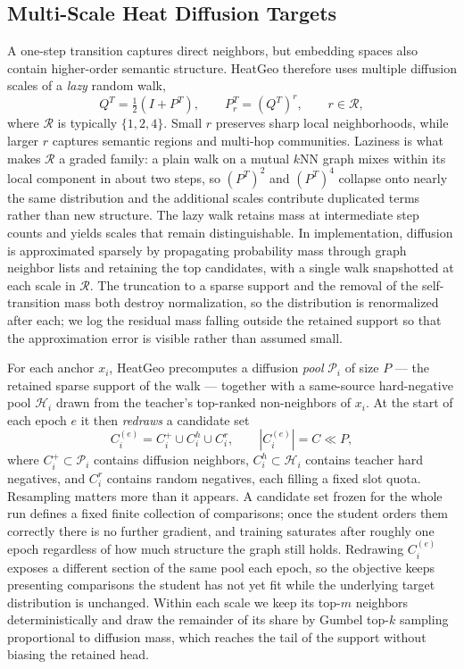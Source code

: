 \subsection{Multi-Scale Heat Diffusion Targets}

A one-step transition captures direct neighbors, but embedding spaces also contain higher-order semantic structure. HeatGeo therefore uses multiple diffusion scales of a \emph{lazy} random walk,
\begin{equation}
    Q^T = \tfrac{1}{2}\left(I + P^T\right),
    \qquad
    P_r^T = (Q^T)^r,
    \qquad r \in \mathcal{R},
\end{equation}
where $\mathcal{R}$ is typically $\{1,2,4\}$. Small $r$ preserves sharp local neighborhoods, while larger $r$ captures semantic regions and multi-hop communities. Laziness is what makes $\mathcal{R}$ a graded family: a plain walk on a mutual $k$NN graph mixes within its local component in about two steps, so $(P^T)^2$ and $(P^T)^4$ collapse onto nearly the same distribution and the additional scales contribute duplicated terms rather than new structure. The lazy walk retains mass at intermediate step counts and yields scales that remain distinguishable. In implementation, diffusion is approximated sparsely by propagating probability mass through graph neighbor lists and retaining the top candidates, with a single walk snapshotted at each scale in $\mathcal{R}$. The truncation to a sparse support and the removal of the self-transition mass both destroy normalization, so the distribution is renormalized after each; we log the residual mass falling outside the retained support so that the approximation error is visible rather than assumed small.

For each anchor $x_i$, HeatGeo precomputes a diffusion \emph{pool} $\mathcal{P}_i$ of size $P$ --- the retained sparse support of the walk --- together with a same-source hard-negative pool $\mathcal{H}_i$ drawn from the teacher's top-ranked non-neighbors of $x_i$. At the start of each epoch $e$ it then \emph{redraws} a candidate set
\begin{equation}
    C_i^{(e)} = C_i^{+} \cup C_i^{h} \cup C_i^{r},
    \qquad |C_i^{(e)}| = C \ll P,
\end{equation}
where $C_i^{+}\subset\mathcal{P}_i$ contains diffusion neighbors, $C_i^{h}\subset\mathcal{H}_i$ contains teacher hard negatives, and $C_i^{r}$ contains random negatives, each filling a fixed slot quota. Resampling matters more than it appears. A candidate set frozen for the whole run defines a fixed finite collection of comparisons; once the student orders them correctly there is no further gradient, and training saturates after roughly one epoch regardless of how much structure the graph still holds. Redrawing $C_i^{(e)}$ exposes a different section of the same pool each epoch, so the objective keeps presenting comparisons the student has not yet fit while the underlying target distribution is unchanged. Within each scale we keep its top-$m$ neighbors deterministically and draw the remainder of its share by Gumbel top-$k$ sampling proportional to diffusion mass, which reaches the tail of the support without biasing the retained head.

